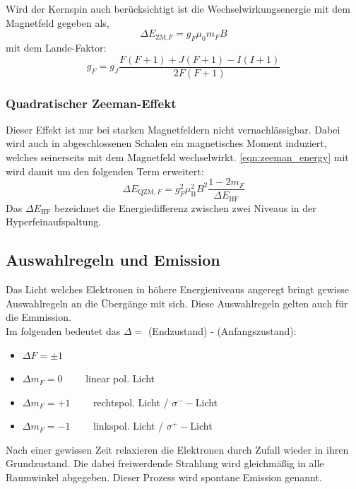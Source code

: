             Wird der Kernspin auch berücksichtigt ist die Wechselwirkungsenergie mit dem Magnetfeld gegeben als,
            \begin{equation*}
                \Delta E_{\text{ZM,}F} = g_F \mu_0 m_F B
            \end{equation*}
            mit dem Lande-Faktor:
            \begin{equation}
                g_F = g_J \frac{F(F+1) + J(F+1) - I(I+1)}{2F(F+1)}
                \label{eqn:g_F}
            \end{equation}

        \subsubsection*{Quadratischer Zeeman-Effekt}
            Dieser Effekt ist nur bei starken Magnetfeldern nicht vernachlässigbar. Dabei wird auch in abgeschlossenen Schalen ein magnetisches Moment induziert, welches seinerseits mit dem Magnetfeld wechselwirkt.
            \eqref{eqn:zeeman_energy} mit wird damit um den folgenden Term erweitert:
            \begin{equation*}
                \Delta E_{\text{QZM},F} = g_F^2 \mu_{\text{B}}^2 B^2 \frac{1-2m_F}{\Delta E_{\text{HF}}}
            \end{equation*}
            Das $\Delta E_{\text{HF}}$ bezeichnet die Energiedifferenz zwischen zwei Niveaus in der Hyperfeinaufspaltung.

    \subsection{Auswahlregeln und Emission}
        Das Licht welches Elektronen in höhere Energieniveaus angeregt bringt gewisse Auswahlregeln an die Übergänge mit sich. Diese Auswahlregeln gelten auch für die Emmission.\\
        Im folgenden bedeutet das $\Delta = $ (Endzustand) - (Anfangszustand):
        \begin{itemize}
            \item $\Delta F = \pm 1$
            \item $\Delta m_F = 0 \qquad$ linear pol. Licht
            \item $\Delta m_F = +1 \qquad$ rechtspol. Licht / $\sigma^- -$Licht
            \item $\Delta m_F = -1 \qquad$ linkspol. Licht / $\sigma^+ -$Licht
        \end{itemize}
        Nach einer gewissen Zeit relaxieren die Elektronen durch Zufall wieder in ihren Grundzustand. Die dabei freiwerdende Strahlung wird gleichmäßig in alle Raumwinkel abgegeben. Dieser Prozess wird spontane Emission genannt.

